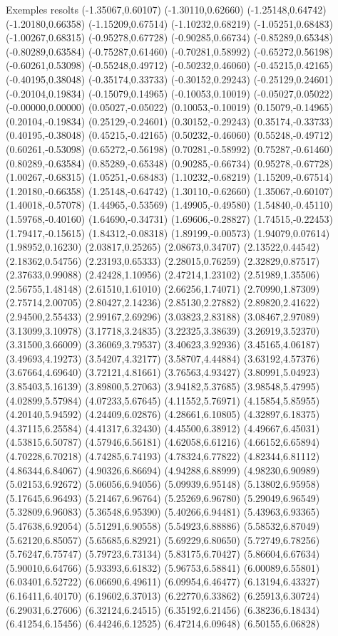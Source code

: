 \documentclass[11pt,a4paper]{article}
\begin{document}
\begin{fmex}{Exemples resolts}
(-1.35067,0.60107) (-1.30110,0.62660) (-1.25148,0.64742) (-1.20180,0.66358) (-1.15209,0.67514) (-1.10232,0.68219) (-1.05251,0.68483) (-1.00267,0.68315) (-0.95278,0.67728) (-0.90285,0.66734) (-0.85289,0.65348) (-0.80289,0.63584) (-0.75287,0.61460) (-0.70281,0.58992) (-0.65272,0.56198) (-0.60261,0.53098) (-0.55248,0.49712) (-0.50232,0.46060) (-0.45215,0.42165) (-0.40195,0.38048) (-0.35174,0.33733) (-0.30152,0.29243) (-0.25129,0.24601) (-0.20104,0.19834) (-0.15079,0.14965) (-0.10053,0.10019) (-0.05027,0.05022) (-0.00000,0.00000) (0.05027,-0.05022) (0.10053,-0.10019) (0.15079,-0.14965) (0.20104,-0.19834) (0.25129,-0.24601) (0.30152,-0.29243) (0.35174,-0.33733) (0.40195,-0.38048) (0.45215,-0.42165) (0.50232,-0.46060) (0.55248,-0.49712) (0.60261,-0.53098) (0.65272,-0.56198) (0.70281,-0.58992) (0.75287,-0.61460) (0.80289,-0.63584) (0.85289,-0.65348) (0.90285,-0.66734) (0.95278,-0.67728) (1.00267,-0.68315) (1.05251,-0.68483) (1.10232,-0.68219) (1.15209,-0.67514) (1.20180,-0.66358) (1.25148,-0.64742) (1.30110,-0.62660) (1.35067,-0.60107) (1.40018,-0.57078) (1.44965,-0.53569) (1.49905,-0.49580) (1.54840,-0.45110) (1.59768,-0.40160) (1.64690,-0.34731) (1.69606,-0.28827) (1.74515,-0.22453) (1.79417,-0.15615) (1.84312,-0.08318) (1.89199,-0.00573) (1.94079,0.07614) (1.98952,0.16230) (2.03817,0.25265) (2.08673,0.34707) (2.13522,0.44542) (2.18362,0.54756) (2.23193,0.65333) (2.28015,0.76259) (2.32829,0.87517) (2.37633,0.99088) (2.42428,1.10956) (2.47214,1.23102) (2.51989,1.35506) (2.56755,1.48148) (2.61510,1.61010) (2.66256,1.74071) (2.70990,1.87309) (2.75714,2.00705) (2.80427,2.14236) (2.85130,2.27882) (2.89820,2.41622) (2.94500,2.55433) (2.99167,2.69296) (3.03823,2.83188) (3.08467,2.97089) (3.13099,3.10978) (3.17718,3.24835) (3.22325,3.38639) (3.26919,3.52370) (3.31500,3.66009) (3.36069,3.79537) (3.40623,3.92936) (3.45165,4.06187) (3.49693,4.19273) (3.54207,4.32177) (3.58707,4.44884) (3.63192,4.57376) (3.67664,4.69640) (3.72121,4.81661) (3.76563,4.93427) (3.80991,5.04923) (3.85403,5.16139) (3.89800,5.27063) (3.94182,5.37685) (3.98548,5.47995) (4.02899,5.57984) (4.07233,5.67645) (4.11552,5.76971) (4.15854,5.85955) (4.20140,5.94592) (4.24409,6.02876) (4.28661,6.10805) (4.32897,6.18375) (4.37115,6.25584) (4.41317,6.32430) (4.45500,6.38912) (4.49667,6.45031) (4.53815,6.50787) (4.57946,6.56181) (4.62058,6.61216) (4.66152,6.65894) (4.70228,6.70218) (4.74285,6.74193) (4.78324,6.77822) (4.82344,6.81112) (4.86344,6.84067) (4.90326,6.86694) (4.94288,6.88999) (4.98230,6.90989) (5.02153,6.92672) (5.06056,6.94056) (5.09939,6.95148) (5.13802,6.95958) (5.17645,6.96493) (5.21467,6.96764) (5.25269,6.96780) (5.29049,6.96549) (5.32809,6.96083) (5.36548,6.95390) (5.40266,6.94481) (5.43963,6.93365) (5.47638,6.92054) (5.51291,6.90558) (5.54923,6.88886) (5.58532,6.87049) (5.62120,6.85057) (5.65685,6.82921) (5.69229,6.80650) (5.72749,6.78256) (5.76247,6.75747) (5.79723,6.73134) (5.83175,6.70427) (5.86604,6.67634) (5.90010,6.64766) (5.93393,6.61832) (5.96753,6.58841) (6.00089,6.55801) (6.03401,6.52722) (6.06690,6.49611) (6.09954,6.46477) (6.13194,6.43327) (6.16411,6.40170) (6.19602,6.37013) (6.22770,6.33862) (6.25913,6.30724) (6.29031,6.27606) (6.32124,6.24515) (6.35192,6.21456) (6.38236,6.18434) (6.41254,6.15456) (6.44246,6.12525) (6.47214,6.09648) (6.50155,6.06828) 
\end{fmex}
\end{document}

